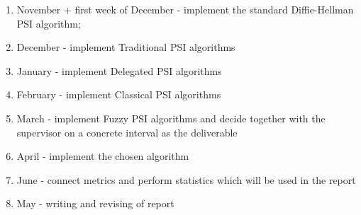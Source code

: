 \documentclass{article}
\begin{document}
\begin{enumerate}
  \item November + first week of December - implement the standard Diffie-Hellman PSI algorithm; 
  \item December - implement Traditional PSI algorithms
  \item January - implement Delegated PSI algorithms
  \item February - implement Classical PSI algorithms
  \item March - implement Fuzzy PSI algorithms and decide together with the supervisor on a concrete interval as the deliverable
  \item April - implement the chosen algorithm
  \item June - connect metrics and perform statistics which will be used in the report
  \item May - writing and revising of report
\end{enumerate} 



\end{document}
